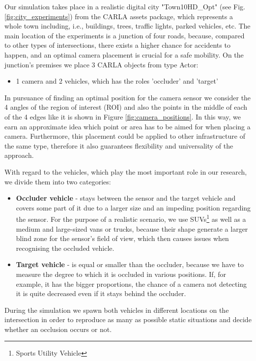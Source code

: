 Our simulation takes place in a realistic digital city "Town10HD\_Opt" (see Fig. \ref{fig:city_experiments}) from the CARLA assets package, which represents a whole town including, i.e., buildings, trees, traffic lights, parked vehicles, etc. The main location of the experiments is a junction of four roads, because, compared to other types of intersections, there exists a higher chance for accidents to happen, and an optimal camera placement is crucial for a safe mobility. On the junction's premises we place 3 CARLA objects from type Actor: 
\begin{itemize}
    \item 1 camera and 2 vehicles, which has the roles 'occluder' and 'target'
\end{itemize}
In pursuance of finding an optimal position for the camera sensor we consider the 4 angles of the region of interest (ROI) and also the points in the middle of each of the 4 edges like it is shown in Figure \ref{fig:camera_positions}. In this way, we earn an approximate idea which point or area has to be aimed for when placing a camera. Furthermore, this placement could be applied to other infrastructure of the same type, therefore it also guarantees flexibility and universality of the approach. 

With regard to the vehicles, which play the most important role in our research, we divide them into two categories:

\begin{itemize}
    \item \textbf{Occluder vehicle} - stays between the sensor and the target vehicle and covers some part of it due to a larger size and an impeding position regarding the sensor. For the purpose of a realistic scenario, we use SUVs\footnote{Sports Utility Vehicle} as well as a medium and large-sized vans or trucks, because their shape generate a larger blind zone for the sensor's field of view, which then causes issues when recognising the occluded vehicle. 
    \item \textbf{Target vehicle} - is equal or smaller than the occluder, because we have to measure the degree to which it is occluded in various positions. If, for example, it has the bigger proportions, the chance of a camera not detecting it is quite decreased even if it stays behind the occluder. 
\end{itemize}
During the simulation we spawn both vehicles in different locations on the intersection in order to reproduce as many as possible static situations and decide whether an occlusion occurs or not.

